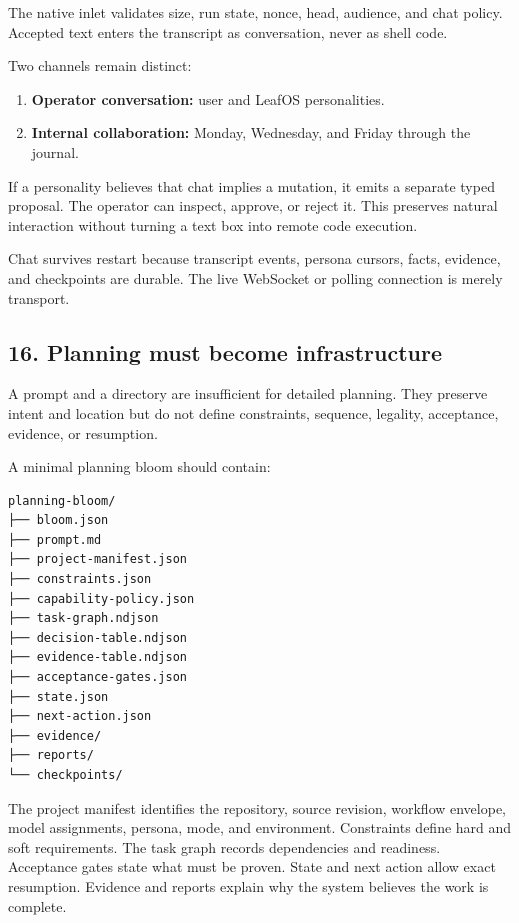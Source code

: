 The native inlet validates size, run state, nonce, head, audience, and chat
policy. Accepted text enters the transcript as conversation, never as shell
code.

Two channels remain distinct:

\begin{enumerate}
\def\labelenumi{\arabic{enumi}.}
\item
  \textbf{Operator conversation:} user and LeafOS personalities.
\item
  \textbf{Internal collaboration:} Monday, Wednesday, and Friday through the
  journal.
\end{enumerate}

If a personality believes that chat implies a mutation, it emits a separate
typed proposal. The operator can inspect, approve, or reject it. This preserves
natural interaction without turning a text box into remote code execution.

Chat survives restart because transcript events, persona cursors, facts,
evidence, and checkpoints are durable. The live WebSocket or polling connection
is merely transport.

\subsection{16. Planning must become infrastructure}

A prompt and a directory are insufficient for detailed planning. They preserve
intent and location but do not define constraints, sequence, legality,
acceptance, evidence, or resumption.

A minimal planning bloom should contain:

\begin{verbatim}
planning-bloom/
├── bloom.json
├── prompt.md
├── project-manifest.json
├── constraints.json
├── capability-policy.json
├── task-graph.ndjson
├── decision-table.ndjson
├── evidence-table.ndjson
├── acceptance-gates.json
├── state.json
├── next-action.json
├── evidence/
├── reports/
└── checkpoints/
\end{verbatim}

The project manifest identifies the repository, source revision, workflow
envelope, model assignments, persona, mode, and environment. Constraints define
hard and soft requirements. The task graph records dependencies and readiness.
Acceptance gates state what must be proven. State and next action allow exact
resumption. Evidence and reports explain why the system believes the work is
complete.

